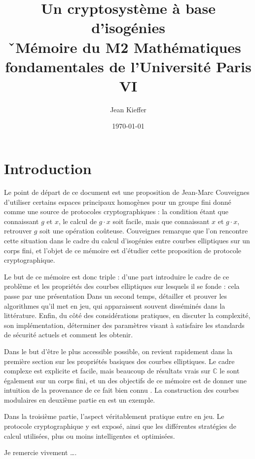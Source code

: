 \documentclass[11pt,a4paper]{article}
\title{Un cryptosystème à base d'isogénies\\
\v
\normalsize Mémoire du M2 Mathématiques fondamentales de l'Université Paris VI}
\author{Jean Kieffer}
\date{\today}
\newcommand{\C}{\mathbb{C}}
\theoremstyle{definition}
\begin{document}
\maketitle
\newpage

\section{Introduction}

Le point de départ de ce document est une proposition de Jean-Marc Couveignes \cite{Couv} d'utiliser certains espaces principaux homogènes pour un groupe fini donné comme une source de protocoles cryptographiques : la condition étant que connaissant $g$ et $x$, le calcul de $g\cdot x$ soit facile, mais que connaissant $x$ et $g\cdot x$, retrouver $g$ soit une opération coûteuse. Couveignes remarque que l'on rencontre cette situation dans le cadre du calcul d'isogénies entre courbes elliptiques sur un corps fini, et l'objet de ce mémoire est d'étudier cette proposition de protocole cryptographique.

Le but de ce mémoire est donc triple : d'une part introduire le cadre de ce problème et les propriétés des courbes elliptiques sur lesquels il se fonde : cela passe par une présentation  Dans un second temps, détailler et prouver les algorithmes qu'il met en jeu, qui apparaissent souvent disséminés dans la littérature. Enfin, du côté des considérations pratiques, en discuter la complexité, son implémentation, déterminer des paramètres visant à satisfaire les standards de sécurité actuels et comment les obtenir.

Dans le but d'être le plus accessible possible, on revient rapidement dans la première section sur les propriétés basiques des courbes elliptiques. Le cadre complexe est explicite et facile, mais beaucoup de résultats vrais sur $\C$ le sont également sur un corps fini, et un des objectifs de ce mémoire est de donner une intuition de la provenance de ce fait \og bien connu \fg. La construction des courbes modulaires en deuxième partie en est un exemple.

Dans la troisième partie, l'aspect véritablement pratique entre en jeu. Le protocole cryptographique y est exposé, ainsi que les différentes stratégies de calcul utilisées, plus ou moins intelligentes et optimisées. 

Je remercie vivement \ldots.

\newpage

\tableofcontents

\newpage
\end{document}
